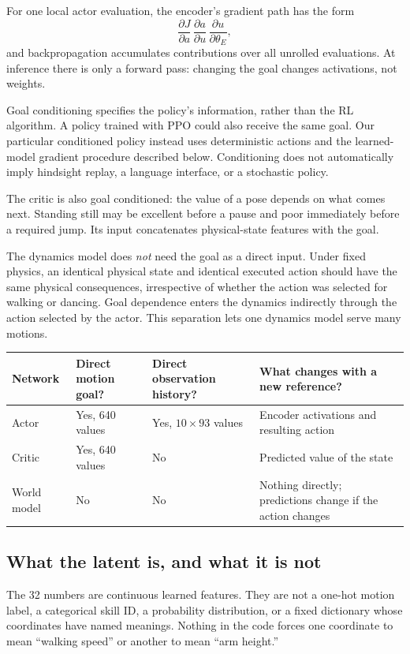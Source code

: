 \documentclass[11pt,a4paper]{article}
\begin{document}
For one local actor evaluation, the encoder's gradient path has the form
\begin{equation}
\frac{\partial J}{\partial a}\,
\frac{\partial a}{\partial u}\,
\frac{\partial u}{\partial\theta_E},
\end{equation}
and backpropagation accumulates contributions over all unrolled evaluations.
At inference there is only a forward pass: changing the goal changes
activations, not weights.

Goal conditioning specifies the policy's information, rather than the RL
algorithm. A policy trained with PPO could also receive the same goal. Our
particular conditioned policy instead uses deterministic actions and the
learned-model gradient procedure described below. Conditioning does not
automatically imply hindsight replay, a language interface, or a stochastic policy.

The critic is also goal conditioned: the value of a pose depends on what comes
next. Standing still may be excellent before a pause and poor immediately before
a required jump. Its input concatenates physical-state features with the goal.

The dynamics model does \emph{not} need the goal as a direct input. Under fixed
physics, an identical physical state and identical executed action should have
the same physical consequences, irrespective of whether the action was selected
for walking or dancing. Goal dependence enters the dynamics indirectly through
the action selected by the actor. This separation lets one dynamics model serve
many motions.

\begin{tabularx}{\linewidth}{@{}lXXX@{}}
\toprule
Network & Direct motion goal? & Direct observation history? & What changes with a new reference?\\
\midrule
Actor & Yes, 640 values & Yes, $10\times93$ values & Encoder activations and resulting action\\
Critic & Yes, 640 values & No & Predicted value of the state\\
World model & No & No & Nothing directly; predictions change if the action changes\\
\bottomrule
\end{tabularx}

\subsection{What the latent is, and what it is not}
The 32 numbers are continuous learned features. They are not a one-hot motion
label, a categorical skill ID, a probability distribution, or a fixed dictionary
whose coordinates have named meanings. Nothing in the code forces one coordinate
to mean ``walking speed'' or another to mean ``arm height.''
\end{document}
